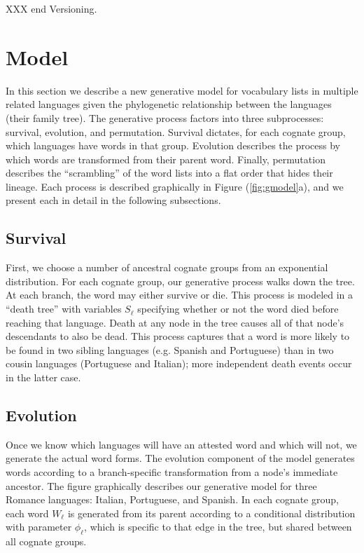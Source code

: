 \documentclass[11pt,a4paper]{article}
\begin{document}
XXX end Versioning.

\section{Model}

In this section we describe a new generative model for vocabulary lists
in multiple related languages given the phylogenetic relationship
between the languages (their family tree). The generative
process factors into three subprocesses: survival, evolution, and
permutation. Survival dictates, for each cognate group, which
languages have words in that group. Evolution describes the process
by which words are transformed from their parent word. Finally,
permutation describes the ``scrambling'' of the word lists into a flat
order that hides their lineage. Each process is
described graphically in Figure (\ref{fig:gmodel}a), and we present
each in detail in the following subsections.

\subsection{Survival}

First, we choose a number of ancestral cognate groups from an
exponential distribution.  For each cognate group, our generative
process walks down the tree.  At each branch, the word may either
survive or die.  This process is modeled in a ``death tree'' with
variables $S_\ell$ specifying whether or not the word died before
reaching that language. Death at any node in the tree causes all
of that node's descendants to also be dead.  This process captures
that a word is more likely to be found in two sibling languages
(e.g. Spanish and Portuguese) than in two cousin languages
(Portuguese and Italian); more independent death events occur in the latter case. 


\subsection{Evolution}

Once we know which languages will have an attested word and which
will not, we generate the actual word forms. The evolution component of
the model generates words according to a branch-specific transformation from a node's 
immediate ancestor.  The figure graphically describes our generative
model for three Romance languages: Italian, Portuguese, and Spanish.
In each cognate group, each word $W_\ell$ is generated from its
parent according to a conditional distribution with parameter $\phi_\ell$,
which is specific to that edge in the tree, but shared between all
cognate groups.
\end{document}
